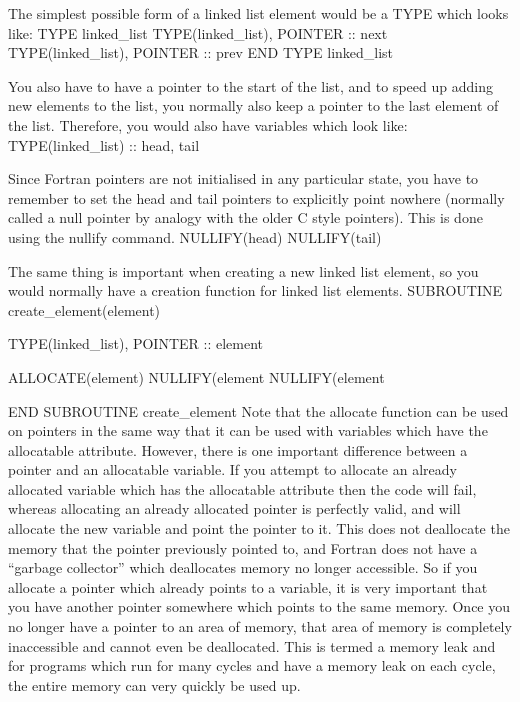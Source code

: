 \documentclass[12pt,a4paper]{article}
\newenvironment{boxverbatim}{\lboxverbatim{none}}{\endlboxverbatim}
\begin{document}
The simplest possible form of a linked list element would be a TYPE which
looks like:
\begin{boxverbatim}
TYPE linked_list
  TYPE(linked_list), POINTER :: next
  TYPE(linked_list), POINTER :: prev
END TYPE linked_list
\end{boxverbatim}

You also have to have a pointer to the start of the list, and to speed up
adding new elements to the list, you normally also keep a pointer to the
last element of the list. Therefore, you would also have variables which look
like:
\begin{boxverbatim}
TYPE(linked_list) :: head, tail
\end{boxverbatim}

Since Fortran pointers are not initialised in any particular state, you have
to remember to set the head and tail pointers to explicitly point nowhere
(normally called a null pointer by analogy with the older C style
pointers). This is done using the nullify command.
\begin{boxverbatim}
NULLIFY(head)
NULLIFY(tail)
\end{boxverbatim}

The same thing is important when creating a new linked list element, so you
would normally have a creation function for linked list elements.
\begin{boxverbatim}
SUBROUTINE create_element(element)

  TYPE(linked_list), POINTER :: element

  ALLOCATE(element)
  NULLIFY(element%
  NULLIFY(element%

END SUBROUTINE create_element
\end{boxverbatim}
Note that the allocate function can be used on pointers in the same way that
it can be used with variables which have the allocatable attribute. However,
there is one important difference between a pointer and an allocatable
variable. If you attempt to allocate an already allocated variable which has
the allocatable attribute then the code will fail, whereas allocating an
already allocated pointer is perfectly valid, and will allocate the new
variable and point the pointer to it. This does not deallocate the memory that
the pointer previously pointed to, and Fortran does not have a ``garbage
collector'' which deallocates memory no longer accessible. So if you
allocate a pointer which already points to a variable, it is very important
that you have another pointer somewhere which points to the same memory. Once
you no longer have a pointer to an area of memory, that area of memory is
completely inaccessible and cannot even be deallocated. This is termed a
memory leak and for programs which run for many cycles and have a memory leak
on each cycle, the entire memory can very quickly be used up.
\end{document}
